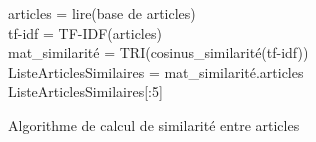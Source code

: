     \begin{algorithm2e}[H]
        \SetAlgoLined
        articles = lire(base de articles)\\
        tf-idf = TF-IDF(articles)\\
        mat\_similarité = TRI(cosinus\_similarité(tf-idf))\\
        ListeArticlesSimilaires = mat\_similarité.articles\\
        \Return ListeArticlesSimilaires[:5]
        \caption{Algorithme de calcul de similarité entre articles}
    \end{algorithm2e}
